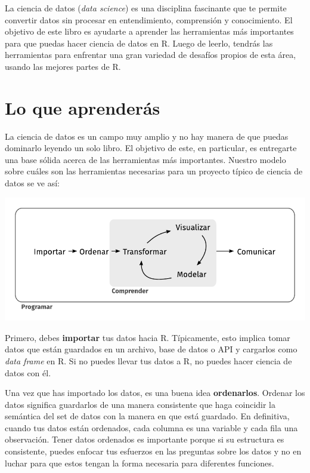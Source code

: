 \documentclass[11pt,oneside]{report}
\begin{document}
La ciencia de datos (\emph{data science}) es una disciplina fascinante
que te permite convertir datos sin procesar en entendimiento,
comprensión y conocimiento. El objetivo de este libro es ayudarte a
aprender las herramientas más importantes para que puedas hacer ciencia
de datos en R. Luego de leerlo, tendrás las herramientas para enfrentar
una gran variedad de desafíos propios de esta área, usando las mejores
partes de R.

\hypertarget{lo-que-aprenderuxe1s}{%
\section{Lo que aprenderás}\label{lo-que-aprenderuxe1s}}

La ciencia de datos es un campo muy amplio y no hay manera de que puedas
dominarlo leyendo un solo libro. El objetivo de este, en particular, es
entregarte una base sólida acerca de las herramientas más importantes.
Nuestro modelo sobre cuáles son las herramientas necesarias para un
proyecto típico de ciencia de datos se ve así:

\begin{center}\includegraphics[width=0.75\linewidth]{diagrams_pdf/es/data-science} \end{center}

Primero, debes \textbf{importar} tus datos hacia R. Típicamente, esto
implica tomar datos que están guardados en un archivo, base de datos o
API y cargarlos como \emph{data frame} en R. Si no puedes llevar tus
datos a R, no puedes hacer ciencia de datos con él.

Una vez que has importado los datos, es una buena idea
\textbf{ordenarlos}. Ordenar los datos significa guardarlos de una
manera consistente que haga coincidir la semántica del set de datos con
la manera en que está guardado. En definitiva, cuando tus datos están
ordenados, cada columna es una variable y cada fila una observación.
Tener datos ordenados es importante porque si su estructura es
consistente, puedes enfocar tus esfuerzos en las preguntas sobre los
datos y no en luchar para que estos tengan la forma necesaria para
diferentes funciones.
\end{document}
